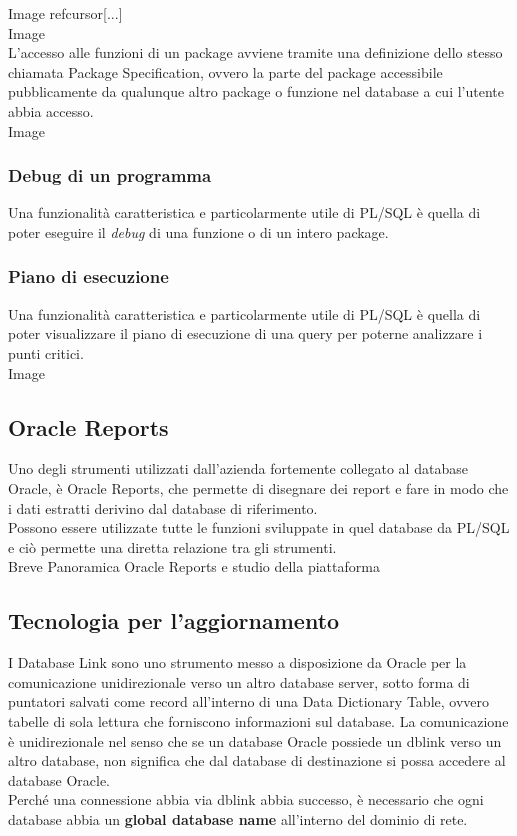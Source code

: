 Image\newline
refcursor[...]\\
Image\\
L'accesso alle funzioni di un package avviene tramite una definizione dello stesso chiamata Package Specification, ovvero la parte del package accessibile pubblicamente da qualunque altro package o funzione nel database a cui l'utente abbia accesso.\newline
[...]\\
Image\\
\subsubsection{Debug di un programma}
Una funzionalità caratteristica e particolarmente utile di PL/SQL è quella di poter eseguire il \textit{debug} di una funzione o di un intero package. \newline
[...]

\subsubsection{Piano di esecuzione}
Una funzionalità caratteristica e particolarmente utile di PL/SQL è quella di poter visualizzare il piano di esecuzione di una query per poterne analizzare i punti critici. \newline
[...]\\
Image

\subsection{Oracle Reports}
Uno degli strumenti utilizzati dall'azienda fortemente collegato al database Oracle, è Oracle Reports, che permette di disegnare dei report e fare in modo che i dati estratti derivino dal database di riferimento.\\
Possono essere utilizzate tutte le funzioni sviluppate in quel database da PL/SQL e ciò permette una diretta relazione tra gli strumenti.\newline
[...]\\
 Breve Panoramica Oracle Reports e studio della piattaforma

\subsection{Tecnologia per l'aggiornamento}
I Database Link sono uno strumento messo a disposizione da Oracle per la comunicazione unidirezionale verso un altro database server, sotto forma di puntatori salvati come record all'interno di una Data Dictionary Table, ovvero tabelle di sola lettura che forniscono informazioni sul database. La comunicazione è unidirezionale nel senso che se un database Oracle possiede un dblink verso un altro database, non significa che dal database di destinazione si possa accedere al database Oracle.\\
Perché una connessione abbia via dblink abbia successo, è necessario che ogni database abbia un \textbf{global database name} all'interno del dominio di rete.\newline
[...]